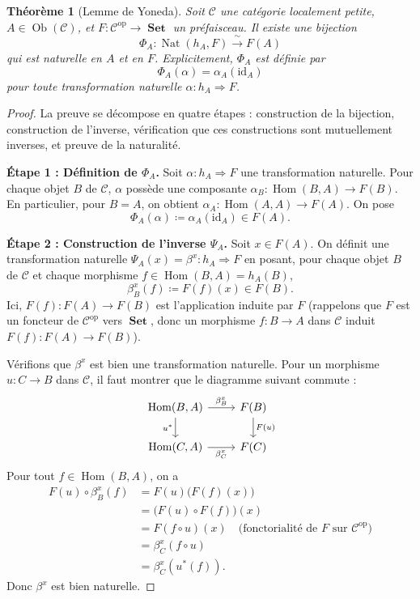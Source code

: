 \documentclass[a4paper,12pt]{book}
\DeclareMathOperator{\Hom}{Hom}
\DeclareMathOperator{\Ob}{Ob}
\DeclareMathOperator{\Nat}{Nat}
\DeclareMathOperator{\Set}{\mathbf{Set}}
\newcommand{\op}{\mathrm{op}}
\newcommand{\id}{\mathrm{id}}
\newtheorem{theoreme}{Théorème}[chapter]
\begin{document}
\begin{theoreme}[Lemme de Yoneda]\label{thm:lemme-yoneda}
Soit $\mathcal{C}$ une catégorie localement petite,
$A \in \Ob(\mathcal{C})$, et $F \colon \mathcal{C}^{\op} \to \Set$
un préfaisceau. Il existe une bijection
\[
    \Phi_A \colon \Nat(h_A, F) \xrightarrow{\;\sim\;} F(A)
\]
qui est naturelle en $A$ et en $F$.
Explicitement, $\Phi_A$ est définie par
\[
    \Phi_A(\alpha) = \alpha_A(\id_A)
\]
pour toute transformation naturelle $\alpha \colon h_A \Rightarrow F$.
\end{theoreme}

\begin{proof}
La preuve se décompose en quatre étapes : construction de la bijection,
construction de l'inverse, vérification que ces constructions sont
mutuellement inverses, et preuve de la naturalité.

\medskip
\textbf{Étape 1 : Définition de $\Phi_A$.}
Soit $\alpha \colon h_A \Rightarrow F$ une transformation naturelle.
Pour chaque objet $B$ de $\mathcal{C}$, $\alpha$ possède une composante
$\alpha_B \colon \Hom(B, A) \to F(B)$.
En particulier, pour $B = A$, on obtient
$\alpha_A \colon \Hom(A, A) \to F(A)$.
On pose
\[
    \Phi_A(\alpha) \coloneqq \alpha_A(\id_A) \in F(A).
\]

\medskip
\textbf{Étape 2 : Construction de l'inverse $\Psi_A$.}
Soit $x \in F(A)$. On définit une transformation naturelle
$\Psi_A(x) = \beta^x \colon h_A \Rightarrow F$ en posant,
pour chaque objet $B$ de $\mathcal{C}$ et chaque morphisme
$f \in \Hom(B, A) = h_A(B)$,
\[
    \beta^x_B(f) \coloneqq F(f)(x) \in F(B).
\]
Ici, $F(f) \colon F(A) \to F(B)$ est l'application induite par $F$
(rappelons que $F$ est un foncteur de $\mathcal{C}^{\op}$ vers $\Set$,
donc un morphisme $f \colon B \to A$ dans $\mathcal{C}$ induit
$F(f) \colon F(A) \to F(B)$).

Vérifions que $\beta^x$ est bien une transformation naturelle.
Pour un morphisme $u \colon C \to B$ dans $\mathcal{C}$,
il faut montrer que le diagramme suivant commute :
\[
\begin{tikzcd}
\Hom(B, A) \arrow[r, "\beta^x_B"] \arrow[d, "u^*"'] &
F(B) \arrow[d, "F(u)"] \\
\Hom(C, A) \arrow[r, "\beta^x_C"'] &
F(C)
\end{tikzcd}
\]
Pour tout $f \in \Hom(B, A)$, on a
\begin{align*}
    F(u) \circ \beta^x_B(f)
    &= F(u)\bigl(F(f)(x)\bigr) \\
    &= \bigl(F(u) \circ F(f)\bigr)(x) \\
    &= F(f \circ u)(x) \quad \text{(fonctorialité de $F$ sur $\mathcal{C}^{\op}$)} \\
    &= \beta^x_C(f \circ u) \\
    &= \beta^x_C(u^*(f)).
\end{align*}
Donc $\beta^x$ est bien naturelle.


\end{proof}
\end{document}
